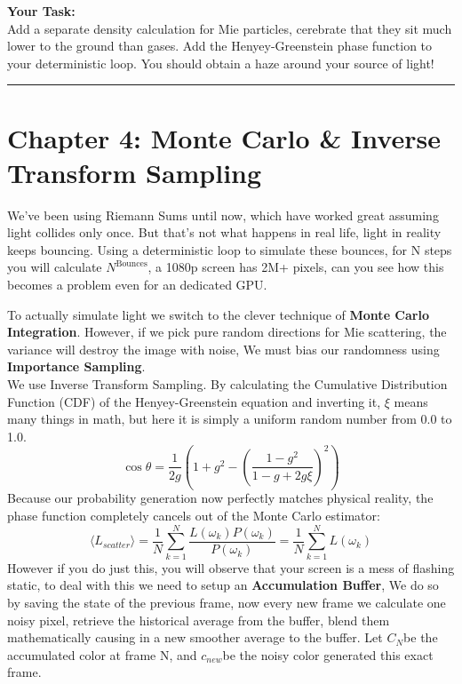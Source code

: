 \documentclass[12pt]{article}
\begin{document}
\vspace{0.2cm}\noindent\textbf{Your Task:}\\
Add a separate density calculation for Mie particles, cerebrate that they sit much lower to the ground than gases. Add the Henyey-Greenstein phase function to your deterministic loop. You should obtain a haze around your source of light! \\

\vspace{0.5cm}\hrule\vspace{0.5cm}

\section*{Chapter 4: Monte Carlo \& Inverse Transform Sampling}
We've been using Riemann Sums until now, which have worked great assuming light collides only once. But that's not what happens in real life, light in reality keeps bouncing. Using a deterministic loop to simulate these bounces, for N steps you will calculate $N^{\text{Bounces}}$, a 1080p screen has 2M+ pixels, can you see how this becomes a problem even for an dedicated GPU.

To actually simulate light we switch to the clever technique of  \textbf{Monte Carlo Integration}. However, if we pick pure random directions for Mie scattering, the variance will destroy the image with noise, We must bias our randomness using \textbf{Importance Sampling}.
\vspace{0.2cm}\noindent\textbf{}\\
We use Inverse Transform Sampling. By calculating the Cumulative Distribution Function (CDF) of the Henyey-Greenstein equation and inverting it,   $\xi$ means many things in math, but here it is simply a uniform random number from 0.0 to 1.0.
\begin{equation}
    \cos\theta = \frac{1}{2g} \left( 1 + g^2 - \left( \frac{1 - g^2}{1 - g + 2g\xi} \right)^2 \right)
\end{equation}
Because our probability generation now perfectly matches physical reality, the phase function completely cancels out of the Monte Carlo estimator:
\begin{equation}
    \langle L_{scatter} \rangle = \frac{1}{N} \sum_{k=1}^{N} \frac{L(\omega_k) P(\omega_k)}{P(\omega_k)} = \frac{1}{N} \sum_{k=1}^{N} L(\omega_k)
\end{equation}
However if you do just this, you will observe that your screen is a mess of flashing static, to deal with this we need to setup an \textbf{Accumulation Buffer}, We do so by saving the state of the previous frame, now every new frame we calculate one noisy pixel, retrieve the historical average from the buffer, blend them mathematically causing in a new smoother average to the buffer. \newline
Let $C_N$​ be the accumulated color at frame N, and $c_{new}$​ be the noisy color generated this exact frame. 
\end{document}
